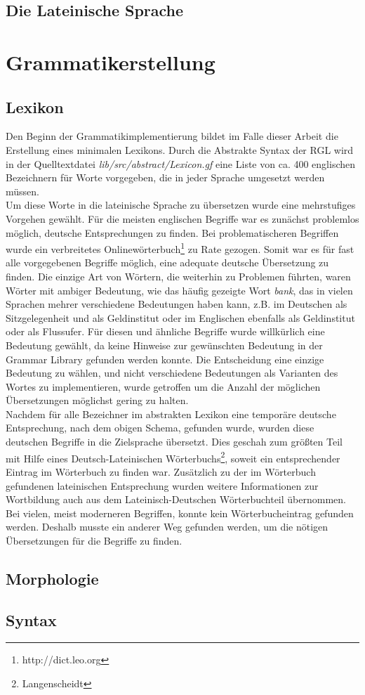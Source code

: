 \documentclass[draft,11pt]{amsbook}
\begin{document}
\subsection{Die Lateinische Sprache}
\section{Grammatikerstellung}
\subsection{Lexikon}
Den Beginn der Grammatikimplementierung bildet im Falle dieser Arbeit die Erstellung eines minimalen Lexikons. Durch die Abstrakte Syntax der RGL wird in der Quelltextdatei \textit{lib/src/abstract/Lexicon.gf} eine Liste von ca. 400 englischen Bezeichnern für Worte vorgegeben, die in jeder Sprache umgesetzt werden müssen. \\
Um diese Worte in die lateinische Sprache zu übersetzen wurde eine mehrstufiges Vorgehen gewählt. Für die meisten englischen Begriffe war es zunächst problemlos möglich, deutsche Entsprechungen zu finden. Bei problematischeren Begriffen wurde ein verbreitetes Onlinewörterbuch\footnote{http://dict.leo.org} zu Rate gezogen. Somit war es für fast alle vorgegebenen Begriffe möglich, eine adequate deutsche Übersetzung zu finden. Die einzige Art von Wörtern, die weiterhin zu Problemen führten, waren Wörter mit ambiger Bedeutung, wie das häufig gezeigte Wort \textit{bank}, das in vielen Sprachen mehrer verschiedene Bedeutungen haben kann, z.B. im Deutschen als Sitzgelegenheit und als Geldinstitut oder im Englischen ebenfalls als Geldinstitut oder als Flussufer. Für diesen und ähnliche Begriffe wurde willkürlich eine Bedeutung gewählt, da keine Hinweise zur gewünschten Bedeutung in der Grammar Library gefunden werden konnte. Die Entscheidung eine einzige Bedeutung zu wählen, und nicht verschiedene Bedeutungen als Varianten des Wortes zu implementieren, wurde getroffen um die Anzahl der möglichen Übersetzungen möglichst gering zu halten. \\
Nachdem für alle Bezeichner im abstrakten Lexikon eine temporäre deutsche Entsprechung, nach dem obigen Schema, gefunden wurde, wurden diese deutschen Begriffe in die Zielsprache übersetzt. Dies geschah zum größten Teil mit Hilfe eines Deutsch-Lateinischen Wörterbuchs\footnote{Langenscheidt}, soweit ein entsprechender Eintrag im Wörterbuch zu finden war. Zusätzlich zu der im Wörterbuch gefundenen lateinischen Entsprechung wurden weitere Informationen zur Wortbildung auch aus dem Lateinisch-Deutschen Wörterbuchteil übernommen. \\
Bei vielen, meist moderneren Begriffen, konnte kein Wörterbucheintrag gefunden werden. Deshalb musste ein anderer Weg gefunden werden, um die nötigen Übersetzungen für die Begriffe zu finden.
\subsection{Morphologie}
\subsection{Syntax}
\end{document}

